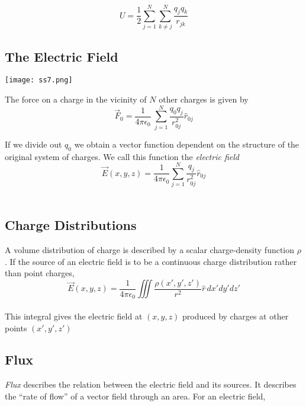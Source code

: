 \documentclass[svgnames]{article}
\begin{document}
\[ U = \frac{1}{2}\sum_{j=1}^N \sum_{k\neq j}^N \frac{q_jq_k}{r_{jk}} \]

\subsection{The Electric Field} 

\vspace{20px}

\begin{center}
\texttt{[image: ss7.png]}
\end{center} 


\vspace{20px}

The force on a charge in the vicinity of $N$ other charges is given by \\ 

\[ \vec{F}_0 = \frac{1}{4\pi\epsilon_0} \ \sum_{j=1}^N \frac{q_0q_j}{r_{0j}^2}\hat{r}_{0j} \]

If we divide out $q_0$ we obtain a vector function dependent on the structure
of the original system of charges. We call this function the \textit{electric field} \\ 

\[ \vec{E}(x,y,z) = \frac{1}{4\pi\epsilon_0}\sum_{j=1}^N \frac{q_j}{r_{0j}^2}\hat{r}_{0j} \] \\


\subsection{Charge Distributions} 

A volume distribution of charge is described by a scalar charge-density
function $\rho$. If the source of an electric field is to be a continuous
charge distribution rather than point charges, \\

\[ \vec{E}(x,y,z) = \frac{1}{4\pi\epsilon_0} \iiint \frac{\rho(x',y',z')}{r^2} \hat{r} \, dx'dy'dz' \] \\

This integral gives the electric field at $(x,y,z)$ produced by charges at other points $(x',y',z')$

\subsection{Flux}
  

\textit{Flux} describes the relation between the electric field and its
sources. It describes the ``rate of flow'' of a vector field through an area. For an electric field, \\
\end{document}
